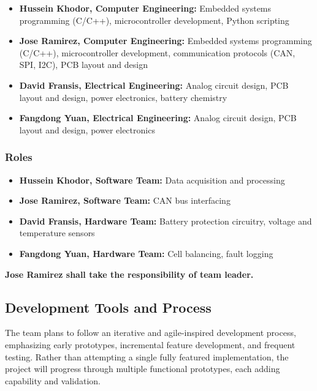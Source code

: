 \begin{itemize}
	\item \textbf{Hussein Khodor, Computer Engineering:} Embedded systems programming (C/C++), microcontroller development, Python scripting
	
	\item \textbf{Jose Ramirez, Computer Engineering:} Embedded systems programming (C/C++), microcontroller development, communication protocols (CAN, SPI, I2C), PCB layout and design
	
	\item \textbf{David Fransis, Electrical Engineering:} Analog circuit design, PCB layout and design, power electronics, battery chemistry
	
	\item \textbf{Fangdong Yuan, Electrical Engineering:} Analog circuit design, PCB layout and design, power electronics
\end{itemize}

\subsubsection{Roles}

\begin{itemize}
	\item \textbf{Hussein Khodor, Software Team:} Data acquisition and processing
	
	\item \textbf{Jose Ramirez, Software Team:} CAN bus interfacing
	
	\item \textbf{David Fransis, Hardware Team:} Battery protection circuitry, voltage and temperature sensors
	
	\item \textbf{Fangdong Yuan, Hardware Team:} Cell balancing, fault logging
\end{itemize}

\textbf{Jose Ramirez shall take the responsibility of team leader.}

\subsection{Development Tools and Process}

The team plans to follow an iterative and agile-inspired development process, emphasizing early prototypes, incremental feature development, and frequent testing. Rather than attempting a single fully featured implementation, the project will progress through multiple functional prototypes, each adding capability and validation.

